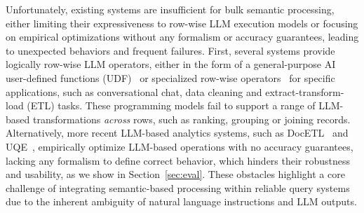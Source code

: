 Unfortunately, existing systems are insufficient for bulk semantic processing, either limiting their expressiveness to row-wise LLM execution models or focusing on empirical optimizations without any formalism or accuracy guarantees, leading to unexpected behaviors and frequent failures. 
First, several systems provide logically row-wise LLM operators, either in the form of a general-purpose AI user-defined functions (UDF)~\cite{motherduck_introducing_nodate, williamdassafmsft_intelligent_2024, noauthor_snow_nodate, vertexai, databricks, noauthor_large_nodate, liu_optimizing_2024} or specialized row-wise operators~\cite{liu_suql_2024, liu_declarative_2024, lin_towards_2024} for specific applications, such as conversational chat, data cleaning and extract-transform-load (ETL) tasks. These programming models fail to support a range of LLM-based transformations \emph{across} rows, such as ranking, grouping or joining records. Alternatively, more recent LLM-based analytics systems, such as DocETL~\cite{shankar_docetl_2024} and UQE~\cite{dai_uqe_2024}, empirically optimize LLM-based operations with no accuracy guarantees, lacking any formalism to define correct behavior, which hinders their robustness and usability, as we show in Section~\ref{sec:eval}. These obstacles highlight a core challenge of integrating semantic-based processing within reliable query systems due to the inherent ambiguity of natural language instructions and LLM outputs.



